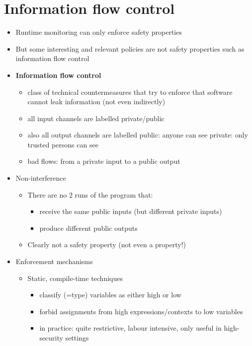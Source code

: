 \documentclass[12pt,titlepage,a4paper]{report}
\begin{document}
		\section{Information flow control}
			\begin{itemize}
				\item Runtime monitoring can only enforce safety properties
				\item But some interesting and relevant policies are not safety properties
				\subitem such as information flow control
				\item \textbf{Information flow control}
				\begin{itemize}
					\item class of technical countermeasures that try to enforce that software cannot leak information (not even indirectly)
					\item all input channels are labelled private/public
					\item also all output channels are labelled
						\subitem public: anyone can see
						\subitem private: only trusted persons can see
					\item bad flows: from a private input to a public output
				\end{itemize}
				\item Non-interference
				\begin{itemize}
					\item There are no 2 runs of the program that:
					\begin{itemize}
						\item receive the same public inputs (but different private inputs)
						\item produce different public outputs
					\end{itemize}
					\item Clearly not a safety property (not even a property!)
				\end{itemize}
				\item Enforcement mechanisms
				\begin{itemize}
					\item Static, compile-time techniques
					\begin{itemize}
						\item classify (=type) variables as either high or low
						\item forbid assignments from high expressions/contexts to low variables
						\item in practice: quite restrictive, labour intensive, only useful in high-security settings

\end{itemize}
\end{itemize}
\end{itemize}
\end{document}
